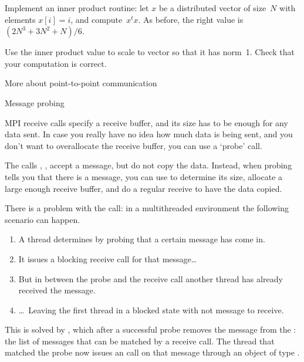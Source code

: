 \begin{exercise}
  \label{ex:inproduct}
  Implement an inner product routine: let $x$ be a
  distributed vector of size~$N$ with elements $x[i]=i$,
  and compute~$x^tx$.
  As before, the right value is $(2N^3+3N^2+N)/6$.

  Use the inner product value to scale to vector so that it has
  norm~1.
  Check that your computation is correct.
\end{exercise}





 {More about point-to-point communication}

 {Message probing}

MPI receive calls specify a receive buffer, and its size has to be
enough for any data sent. In case you really have no idea how much data
is being sent, and you don't want to overallocate the receive buffer,
you can use a `probe' call.

The calls , , accept a message,
but do not copy the data. Instead, when probing tells you that there is a
message, you can use  to determine its size,
allocate a large enough receive buffer, and do a regular receive to
have the data copied.



There is a problem with the  call: in a
multithreaded environment the following scenario can happen.
\begin{enumerate}
\item A thread determines by probing that a certain message has come
  in.
\item It issues a blocking receive call for that message\dots
\item But in between the probe and the receive call another thread
  has already received the message.
\item \dots~Leaving the first thread in a blocked state with not
  message to receive.
\end{enumerate}
This is solved by , which after a successful
probe removes the message from the : the
list of messages that can be matched by a receive call. The thread
that matched the probe now issues an  call on
that message through an object of type .

